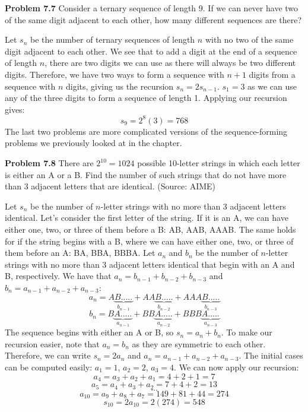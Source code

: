 \documentclass[11pt]{scrartcl}
\begin{document}
\begin{tcolorbox}
\textbf{Problem 7.7} Consider a ternary sequence of length 9. If we can never have two of the same digit adjacent to each other, how many different sequences are there?   
\end{tcolorbox}
\noindent 
Let $s_n$ be the number of ternary sequences of length $n$ with no two of the same digit adjacent to each other. We see that to add a digit at the end of a sequence of length $n$, there are two digits we can use as there will always be two different digits. Therefore, we have two ways to form a sequence with $n+1$ digits from a sequence with $n$ digits, giving us the recursion ${s_n}=2{s_{n-1}}$. ${s_1}=3$ as we can use any of the three digits to form a sequence of length 1. Applying our recursion gives: 
$${s_9}=2^8(3)=768$$
The last two problems are more complicated versions of the sequence-forming problems we previously looked at in the chapter. \\
\begin{tcolorbox}
\textbf{Problem 7.8} There are $2^{10} = 1024$ possible 10-letter strings in which each letter is either an A or a B. Find the number of such strings that do not have more than 3 adjacent letters that are identical. (Source: AIME)
\end{tcolorbox}
\noindent 
Let $s_n$ be the number of $n$-letter strings with no more than 3 adjacent letters identical. Let's consider the first letter of the string. If it is an A, we can have either one, two, or three of them before a B: AB, AAB, AAAB. The same holds for if the string begins with a B, where we can have either one, two, or three of them before an A: BA, BBA, BBBA. Let ${a_n}$ and ${b_n}$ be the number of $n$-letter strings with no more than 3 adjacent letters identical that begin with an A and B, respectively. We have that ${a_n}={b_{n-1}}+{b_{n-2}}+{b_{n-3}}$ and ${b_n}={a_{n-1}}+{a_{n-2}}+{a_{n-3}}$: 
$${a_n}=A{\underbrace{B.....}_{b_{n-1}}}+AA{\underbrace{B.....}_{b_{n-2}}}+AAA{\underbrace{B.....}_{b_{n-3}}}$$
$${b_n}=B{\underbrace{A.....}_{a_{n-1}}}+BB{\underbrace{A.....}_{a_{n-2}}}+BBB{\underbrace{A.....}_{a_{n-3}}}$$
The sequence begins with either an A or B, so ${s_n}={a_n}+{b_n}$. To make our recursion easier, note that ${a_n}={b_n}$ as they are symmetric to each other. Therefore, we can write ${s_n}=2{a_n}$ and ${a_n}={a_{n-1}}+{a_{n-2}}+{a_{n-3}}$. The initial cases can be computed easily: ${a_1}=1$, ${a_2}=2$, ${a_3}=4$. We can now apply our recursion: 
$${a_4}={a_3}+{a_2}+{a_1}=4+2+1=7$$
$${a_5}={a_4}+{a_3}+{a_2}=7+4+2=13$$
$$...$$
$${a_{10}}={a_9}+{a_8}+{a_7}=149+81+44=274$$
$${s_{10}}=2{a_{10}}=2(274)=548$$
\end{document}
